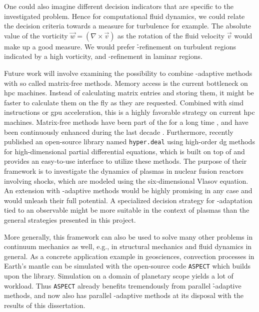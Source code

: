 One could also imagine different decision indicators that are specific to the investigated problem. Hence for computational fluid dynamics, we could relate the decision criteria towards a measure for turbulence for example. The absolute value of the vorticity $\vec{w} = (\nabla \times \vec{v})$ as the rotation of the fluid velocity $\vec{v}$ would make up a good measure. We would prefer \h-refinement on turbulent regions indicated by a high vorticity, and \p-refinement in laminar regions.


Future work will involve examining the possibility to combine \hp-adaptive methods with so called matrix-free methods. Memory access is the current bottleneck on \gls{hpc} machines. Instead of calculating matrix entries and storing them, it might be faster to calculate them on the fly as they are requested. Combined with \gls{simd} instructions or \gls{gpu} acceleration, this is a highly favorable strategy on current \gls{hpc} machines. Matrix-free methods have been part of the \dealii{} for a long time \parencite{kronbichler2012}, and have been continuously enhanced during the last decade \parencite{kronbichler2019}. Furthermore, \textcite{munch2020} recently published an open-source library named \texttt{hyper.deal} using high-order \gls{dg} methods for high-dimensional partial differential equations, which is built on top of \dealii{} and provides an easy-to-use interface to utilize these methods. The purpose of their framework is to investigate the dynamics of plasmas in nuclear fusion reactors involving shocks, which are modeled using the six-dimensional Vlasov equation. An extension with \hp-adaptive methods would be highly promising in any case and would unleash their full potential. A specialized decision strategy for \hp-adaptation tied to an observable might be more suitable in the context of plasmas than the general strategies presented in this project.

More generally, this framework can also be used to solve many other problems in continuum mechanics as well, e.g., in structural mechanics and fluid dynamics in general. As a concrete application example in geosciences, convection processes in Earth's mantle can be simulated with the open-source code \texttt{ASPECT} \parencite{kronbichler2012a,aspect210} which builds upon the \dealii{} library. Simulation on a domain of planetary scope yields a lot of workload. Thus \texttt{ASPECT} already benefits tremendously from parallel \h-adaptive methods, and now also has parallel \hp-adaptive methods at its disposal with the results of this dissertation.


